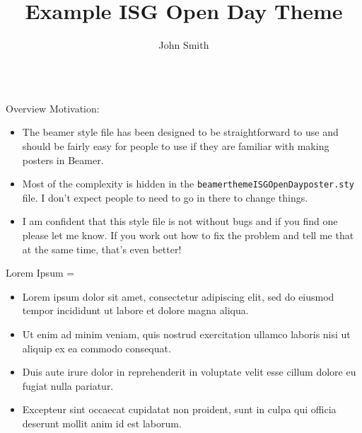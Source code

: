 \documentclass[final,hyperref={pdfpagelabels=false}]{beamer}
\title{Example ISG Open Day Theme}
\author{John Smith}
\newcommand{\correctitemizeindent}{\setlength{\leftmargini}{2.5em}}
\newlength{\columnheight}
\begin{document}
\justifying
\begin{frame}
  \begin{columns}[T]

	\begin{column}{.32\textwidth}
		\begin{minipage}[t]{.95\textwidth}
		\parbox[t][\columnheight]{\textwidth}{	  	

	    \begin{leftColumnBlock}{Overview}
			Motivation:
			{\correctitemizeindent
			\begin{itemize}
				\item The beamer style file has been designed to be straightforward to use and should be fairly easy for people to use if they are familiar with making posters in Beamer.
				\item Most of the complexity is hidden in the \texttt{beamerthemeISGOpenDayposter.sty} file.  I don't expect people to need to go in there to change things.
				\item I am confident that this style file is not without bugs and if you find one please let me know.  If you work out how to fix the problem and tell me that at the same time, that's even better!
			\end{itemize}}
		\end{leftColumnBlock}

		\vfill

		\begin{leftColumnBlock}{Lorem Ipsum}
			\rightskip=\leftskip
			{\correctitemizeindent
			\begin{itemize}
				\item Lorem ipsum dolor sit amet, consectetur adipiscing elit, sed do eiusmod tempor incididunt ut labore et dolore magna aliqua.
				\item Ut enim ad minim veniam, quis nostrud exercitation ullamco laboris nisi ut aliquip ex ea commodo consequat.
				\item Duis aute irure dolor in reprehenderit in voluptate velit esse cillum dolore eu fugiat nulla pariatur.
				\item Excepteur sint occaecat cupidatat non proident, sunt in culpa qui officia deserunt mollit anim id est laborum.
			\end{itemize}
			}
		\end{leftColumnBlock}
		
		\vfill

}
\end{minipage}
\end{column}
\end{columns}
\end{frame}
\end{document}
